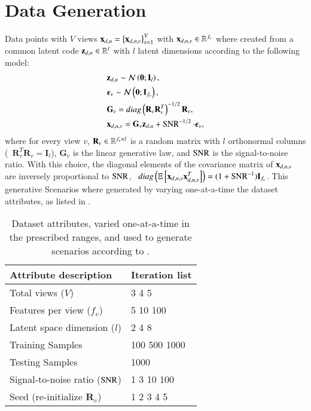 \section{Data Generation}
\label{sm:data_generation}
Data points with $V$ views $\mathbf{x}_{d,n} = \left\{\mathbf{x}_{d,n,v}\right\}_{v=1}^V$ with $\mathbf{x}_{d,n,v} \in \mathbb{R}^{f_v}$ where created
from a common latent code $\mathbf{z}_{d,n} \in \mathbb{R}^l$ with $l$ latent dimensions
according to the following model:
%
\begin{equation}
\label{eq:sinthetic}
\begin{aligned}
	&\mathbf{z}_{d,n} \sim \mathcal{N}\left(\mathbf{0};\mathbf{I}_{l}\right), \\
	&\boldsymbol{\epsilon}_v \sim \mathcal{N}\left(\mathbf{0};\mathbf{I}_{f_v}\right), \\
	&\mathbf{G}_v = diag\left( \mathbf{R}_v \mathbf{R}_v^T \right)^{-1/2} \mathbf{R}_v, \\
	&\mathbf{x}_{d,n,v} = \mathbf{G}_v \mathbf{z}_{d,n} + \operatorname{SNR}^{-1/2} \cdot \boldsymbol{\epsilon}_v,
\end{aligned}
\end{equation}
%
where  for every view $v$, $\mathbf{R}_v \in \mathbb{R}^{f_v \times l}$ is a random matrix with $l$ orthonormal columns
(\ie\ $\mathbf{R}_v^T \mathbf{R}_v = \mathbf{I}_l$),
$\mathbf{G}_v$ is the linear generative law,
and $\operatorname{SNR}$ is the signal-to-noise ratio.
%
With this choice, the diagonal elements of the covariance matrix of $\mathbf{x}_{d,n,v}$ are inversely proportional to $\operatorname{SNR}$, \ie\,
%
$diag\left(\operatorname{\mathbb{E}}\left[\mathbf{x}_{d,n,v} \mathbf{x}_{d,n,v}^T\right]\right) = (1 + \operatorname{SNR}^{-1}) \mathbf{I}_{f_v}$.
%
This generative
%
Scenarios where generated by varying one-at-a-time the dataset attributes, as listed in .
%
\begin{table}[htb]
\caption{Dataset attributes, varied one-at-a-time in the prescribed ranges, and used to generate scenarios according to .
}
\centering
\begin{tabular}{ll}
\toprule
Attribute description          & Iteration list\\
\midrule
Total views ($V$)              & 3 4 5 \\
Features per view ($f_v$)      & 5 10 100 \\
Latent space dimension ($l$)   & 2 4 8 \\
Training Samples               & 100 500 1000 \\
Testing Samples                & 1000 \\
Signal-to-noise ratio ($\operatorname{SNR}$) & 1 3 10 100\\
Seed (re-initialize $\mathbf{R}_v$)  & 1 2 3 4 5\\
\bottomrule
\end{tabular}
\label{table:simul_params}
\end{table}
%
